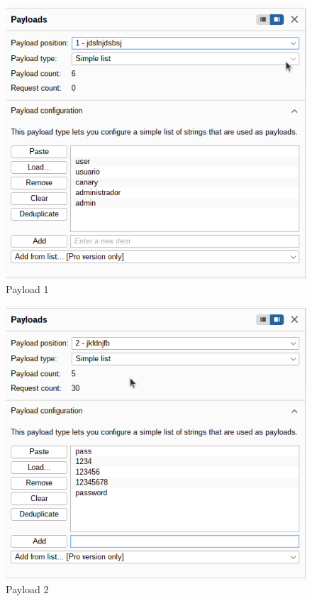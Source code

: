 \documentclass[letterpaper,12pt]{article}
\begin{document}
\begin{figure}
    \centering
    \includegraphics[width=1\linewidth]{identificaryobtenercamposburp/Captura desde 2025-10-01 23-25-19.png}
    \caption{Payload 1}
    \label{fig:payload1}
\end{figure}
\begin{figure}
    \centering
    \includegraphics[width=1\linewidth]{identificaryobtenercamposburp/Captura desde 2025-10-01 23-25-58.png}
    \caption{Payload 2}
    \label{fig:payload2}
\end{figure}
\end{document}
